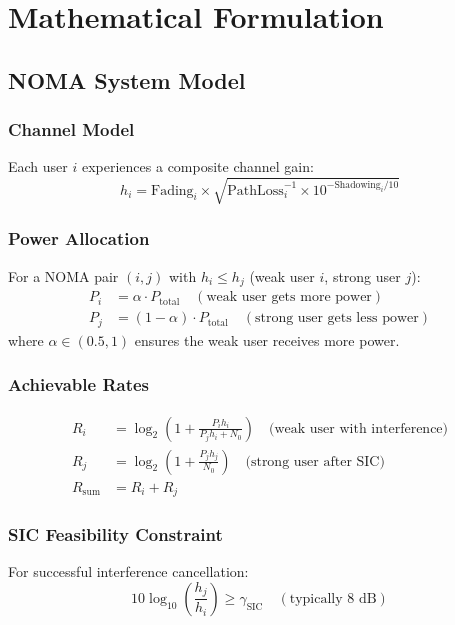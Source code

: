 \documentclass[12pt,a4paper]{article}
\begin{document}
\section{Mathematical Formulation}

\subsection{NOMA System Model}

\subsubsection{Channel Model}
Each user $i$ experiences a composite channel gain:
\begin{equation}
h_i = \text{Fading}_i \times \sqrt{\text{PathLoss}_i^{-1} \times 10^{-\text{Shadowing}_i/10}}
\end{equation}

\subsubsection{Power Allocation}
For a NOMA pair $(i,j)$ with $h_i \leq h_j$ (weak user $i$, strong user $j$):
\begin{align}
P_i &= \alpha \cdot P_{\text{total}} \quad (\text{weak user gets more power}) \\
P_j &= (1-\alpha) \cdot P_{\text{total}} \quad (\text{strong user gets less power})
\end{align}
where $\alpha \in (0.5, 1)$ ensures the weak user receives more power.

\subsubsection{Achievable Rates}
\begin{align}
R_i &= \log_2\left(1 + \frac{P_i h_i}{P_j h_i + N_0}\right) \quad \text{(weak user with interference)} \\
R_j &= \log_2\left(1 + \frac{P_j h_j}{N_0}\right) \quad \text{(strong user after SIC)} \\
R_{\text{sum}} &= R_i + R_j
\end{align}

\subsubsection{SIC Feasibility Constraint}
For successful interference cancellation:
\begin{equation}
10 \log_{10}\left(\frac{h_j}{h_i}\right) \geq \gamma_{\text{SIC}} \quad (\text{typically } 8 \text{ dB})
\end{equation}
\end{document}
